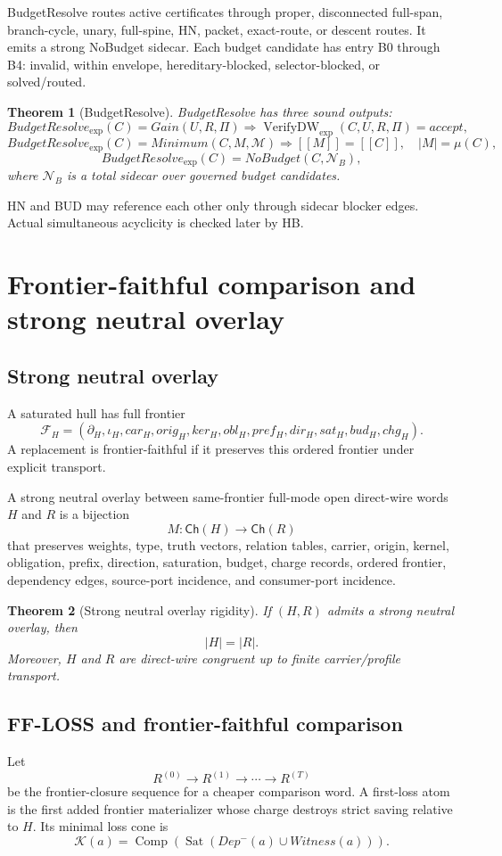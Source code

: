 \documentclass[10.5pt,a4paper]{article}
\newtheorem{theorem}{Theorem}[section]
\newcommand{\Ch}{\mathsf{Ch}}
\newcommand{\Front}{\mathcal F}
\newcommand{\Sat}{\operatorname{Sat}}
\newcommand{\Comp}{\operatorname{Comp}}
\newcommand{\VerifyDW}{\operatorname{VerifyDW}_{\exp}}
\begin{document}
BudgetResolve routes active certificates through proper, disconnected full-span, branch-cycle, unary, full-spine, HN, packet, exact-route, or descent routes. It emits a strong NoBudget sidecar. Each budget candidate has entry B0 through B4: invalid, within envelope, hereditary-blocked, selector-blocked, or solved/routed.

\begin{theorem}[BudgetResolve]
BudgetResolve has three sound outputs:
\[
BudgetResolve_{\exp}(C)=Gain(U,R,\Pi)\Rightarrow \VerifyDW(C,U,R,\Pi)=accept,
\]
\[
BudgetResolve_{\exp}(C)=Minimum(C,M,\mathcal M)\Rightarrow [[M]]=[[C]],\quad |M|=\mu(C),
\]
\[
BudgetResolve_{\exp}(C)=NoBudget(C,\mathcal N_B),
\]
where \(\mathcal N_B\) is a total sidecar over governed budget candidates.
\end{theorem}

HN and BUD may reference each other only through sidecar blocker edges. Actual simultaneous acyclicity is checked later by HB.

\section{Frontier-faithful comparison and strong neutral overlay}

\subsection{Strong neutral overlay}
A saturated hull has full frontier
\[
\Front_H=(\partial_H,\iota_H,car_H,orig_H,ker_H,obl_H,pref_H,dir_H,sat_H,bud_H,chg_H).
\]
A replacement is frontier-faithful if it preserves this ordered frontier under explicit transport.

A strong neutral overlay between same-frontier full-mode open direct-wire words \(H\) and \(R\) is a bijection
\[
M:\Ch(H)\to\Ch(R)
\]
that preserves weights, type, truth vectors, relation tables, carrier, origin, kernel, obligation, prefix, direction, saturation, budget, charge records, ordered frontier, dependency edges, source-port incidence, and consumer-port incidence.

\begin{theorem}[Strong neutral overlay rigidity]
If \((H,R)\) admits a strong neutral overlay, then
\[
|H|=|R|.
\]
Moreover, \(H\) and \(R\) are direct-wire congruent up to finite carrier/profile transport.
\end{theorem}

\subsection{FF-LOSS and frontier-faithful comparison}
Let
\[
R^{(0)}\to R^{(1)}\to\cdots\to R^{(T)}
\]
be the frontier-closure sequence for a cheaper comparison word. A first-loss atom is the first added frontier materializer whose charge destroys strict saving relative to \(H\). Its minimal loss cone is
\[
\mathcal K(a)=\Comp(\Sat(Dep^-(a)\cup Witness(a))).
\]
\end{document}
